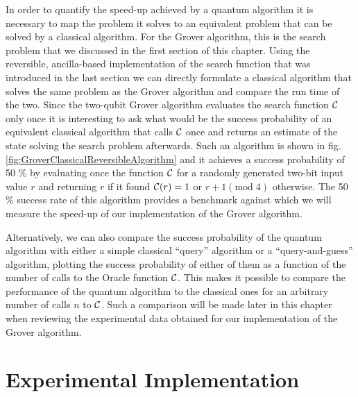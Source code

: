 In order to quantify the speed-up achieved by a quantum algorithm it is necessary to map the problem it solves to an equivalent problem that can be solved by a classical algorithm. For the Grover algorithm, this is the search problem that we discussed in the first section of this chapter. Using the reversible, ancilla-based implementation of the search function that was introduced in the last section we can directly formulate a classical algorithm that solves the same problem as the Grover algorithm and compare the run time of the two. Since the two-qubit Grover algorithm evaluates the search function $\Or$ only once it is interesting to ask what would be the success probability of an equivalent classical algorithm that calls $\Or$ once and returns an estimate of the state solving the search problem afterwards. Such an algorithm is shown in fig. \ref{fig:GroverClassicalReversibleAlgorithm} and it achieves a success probability of 50 \% by evaluating once the function $\Or$ for a randomly generated two-bit input value $r$ and returning $r$ if it found $\Or(r)=1$ or $r+1(\mathrm{mod}\;4)$ otherwise. The 50 \% success rate of this algorithm provides a benchmark against which we will measure the speed-up of our implementation of the Grover algorithm.

\smallskip

Alternatively, we can also compare the success probability of the quantum algorithm with either a simple classical ``query'' algorithm or a ``query-and-guess'' algorithm, plotting the success probability of either of them as a function of the number of calls to the Oracle function $\Or$. This makes it possible to compare the performance of the quantum algorithm to the classical ones for an arbitrary number of calls $n$ to $\Or$. Such a comparison will be made later in this chapter when reviewing the experimental data obtained for our implementation of the Grover algorithm.

\section{Experimental Implementation}

